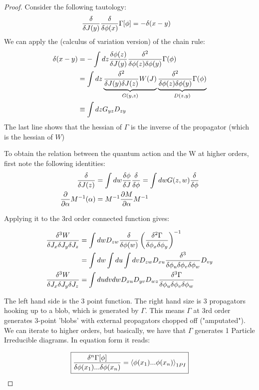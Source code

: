 \documentclass[11pt]{scrartcl}
\begin{document}
\begin{proof}
Consider the following tautology:
\begin{align}
{\delta \over \delta J(y)}{\delta \over \delta \phi (x)} \Gamma[\phi] & = -\delta(x-y)
\end{align}
We can apply the (calculus of variation version) of the chain rule:
\begin{align}
\delta(x-y) & = - \int dz {\delta \phi(z) \over \delta J(y)} {\delta^2 \over \delta \phi(z) \delta \phi(y)} \Gamma(\phi)  \\
  &= \int dz \underbrace{{\delta^2 \over \delta J(y) \delta J(z)} W(J) }_{G(y,z)} \underbrace{{\delta^2 \over \delta \phi(z) \delta \phi(y)} \Gamma(\phi)  }_{D(z, y)} \\
 & \equiv \int dz G_{yz} D_{zy}
\end{align}
The last line shows that the hessian of $\Gamma$ is the inverse of the propagator (which is the hessian of $W$)

To obtain the relation between the quantum action and the W  at higher orders, first note the following identities:
\begin{align}
{\delta \over \delta J(z)}  & = \int dw {\delta \phi \over \delta J} {\delta \over \delta \phi} = \int dw G(z, w) {\delta \over \delta \phi} \\
{\partial \over \partial \alpha } M^{-1} (\alpha)  & = M^{-1} {\partial M \over \partial \alpha} M^{-1}
\end{align}

Applying it to the 3rd order connected function gives:

\begin{align}
{\delta^3 W \over \delta J_x \delta J_y \delta J_z}  & = \int dw D_{zw} {\delta \over \delta \phi(w)} \left( {\delta^2 \Gamma \over \delta \phi_x \delta \phi_y}\right)^{-1} \\
  & = \int dw \int du \int dv  D_{zw} D_{xu} {\delta^3 \over \delta \phi_u \delta \phi_v \delta \phi_w} D_{vy} \\
{\delta^3 W \over \delta J_x \delta J_y \delta J_z}   & = \int du dv dw  D_{xu} D_{yv} D_{wz} {\delta^3  \Gamma \over \delta \phi_u \delta \phi_v \delta \phi_w} 
\end{align}

The left hand side is the 3 point function.  The right hand size is 3 propagators hooking up to a blob, which is generated by $\Gamma$.  This means $\Gamma$ at 3rd order generates 3-point 'blobs' with external propagators chopped off ("amputated").  We can iterate to higher orders, but basically, we have that $\Gamma$ generates 1 Particle Irreducible diagrams.  In equation form it reads:

\begin{align}
\boxed{{\delta^n  \Gamma[\phi] \over \delta \phi(x_1) ... \delta \phi(x_n)} = \braket{\phi(x_1)... \phi(x_n)}_{1PI}}
\end{align}

\end{proof}
\end{document}
